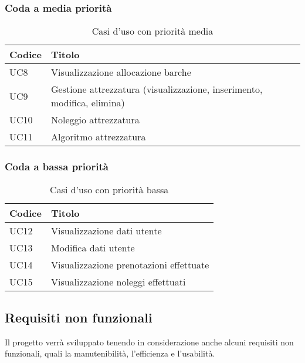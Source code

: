 \subsubsection{Coda a media priorità}

\begin{table}[htbp]
 \centering
 \begin{tabularx}{\textwidth}{|>{\centering\arraybackslash} m{4em}| >{\raggedright\arraybackslash}X |} 
 \hline
 \textbf{Codice} & \textbf{Titolo} \\ [0.5ex] \hline\hline
UC8 & Visualizzazione allocazione barche \\
\hline
UC9 & Gestione attrezzatura (visualizzazione, inserimento, modifica, elimina) \\
\hline
UC10 & Noleggio attrezzatura \\
\hline
UC11 & Algoritmo attrezzatura \\
\hline
\end{tabularx}
\caption{Casi d'uso con priorità media}
\label{Casi d'uso con priorità media}
\end{table}

\subsubsection{Coda a bassa priorità}

\begin{table}[htbp]
 \centering
 \begin{tabularx}{\textwidth}{|>{\centering\arraybackslash} m{4em}| >{\raggedright\arraybackslash}X |} 
 \hline
 \textbf{Codice} & \textbf{Titolo} \\ [0.5ex] \hline\hline
UC12 & Visualizzazione dati utente \\
\hline
UC13 & Modifica dati utente \\
\hline
UC14 & Visualizzazione prenotazioni effettuate \\
\hline
UC15 & Visualizzazione noleggi effettuati \\
\hline
\end{tabularx}
\caption{Casi d'uso con priorità bassa}
\label{Casi d'uso con priorità bassa}
\end{table}

\clearpage

\subsection{Requisiti non funzionali}
Il progetto verrà sviluppato tenendo in considerazione anche alcuni requisiti non funzionali, quali la manutenibilità, l'efficienza e l'usabilità.
